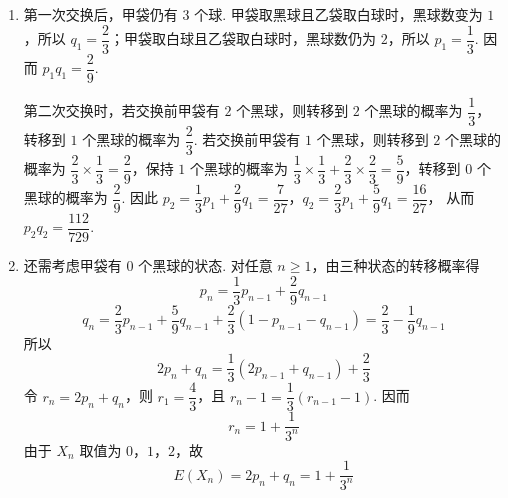 \begin{solution}
\begin{enumerate}
\item 第一次交换后，甲袋仍有 \(3\) 个球. 甲袋取黑球且乙袋取白球时，黑球数变为 \(1\)，所以 \(q_1=\dfrac23\)；甲袋取白球且乙袋取白球时，黑球数仍为 \(2\)，所以 \(p_1=\dfrac13\). 因而 \(p_1q_1=\dfrac29\).

第二次交换时，若交换前甲袋有 \(2\) 个黑球，则转移到 \(2\) 个黑球的概率为 \(\dfrac13\)，转移到 \(1\) 个黑球的概率为 \(\dfrac23\). 若交换前甲袋有 \(1\) 个黑球，则转移到 \(2\) 个黑球的概率为 \(\dfrac23\times\dfrac13=\dfrac29\)，保持 \(1\) 个黑球的概率为 \(\dfrac13\times\dfrac13+\dfrac23\times\dfrac23=\dfrac59\)，转移到 \(0\) 个黑球的概率为 \(\dfrac29\). 因此
\(p_2=\dfrac13p_1+\dfrac29q_1=\dfrac7{27}\)，\(q_2=\dfrac23p_1+\dfrac59q_1=\dfrac{16}{27}\)，
从而 \(p_2q_2=\dfrac{112}{729}\).
\item 还需考虑甲袋有 \(0\) 个黑球的状态. 对任意 \(n\ge1\)，由三种状态的转移概率得
\[
p_n=\dfrac13p_{n-1}+\dfrac29q_{n-1}
\]
\[
q_n=\dfrac23p_{n-1}+\dfrac59q_{n-1}+\dfrac23\left(1-p_{n-1}-q_{n-1}\right)=\dfrac23-\dfrac19q_{n-1}
\]
所以
\[
2p_n+q_n=\dfrac13\left(2p_{n-1}+q_{n-1}\right)+\dfrac23
\]
令 \(r_n=2p_n+q_n\)，则 \(r_1=\dfrac43\)，且 \(r_n-1=\dfrac13(r_{n-1}-1)\). 因而
\[
r_n=1+\dfrac1{3^n}
\]
由于 \(X_n\) 取值为 \(0\)，\(1\)，\(2\)，故
\[
E(X_n)=2p_n+q_n=1+\dfrac1{3^n}
\]
\end{enumerate}
\end{solution}
